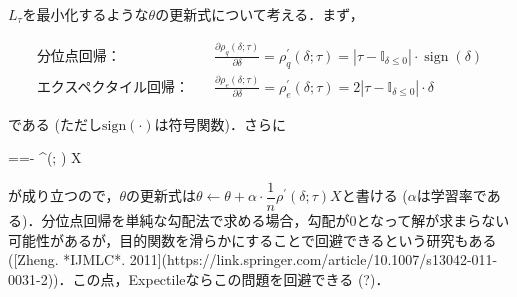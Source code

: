 $L_\tau$を最小化するような$\theta$の更新式について考える．まず，



\begin{align}
\text{分位点回帰：}&\quad
\frac{\partial \rho_q(\delta; \tau)}{\partial \delta}= \rho_q^{\prime}(\delta; \tau)=\left|\tau-\mathbb{I}_{\delta \leq 0}\right| \cdot
\operatorname{sign}(\delta)\\
\text{エクスペクタイル回帰：}&\quad
\frac{\partial \rho_e(\delta; \tau)}{\partial \delta}= \rho_e^{\prime}(\delta; \tau)=2\left|\tau-\mathbb{I}_{\delta \leq 0}\right| \cdot
\delta
\end{align}


である (ただし$\text{sign}(\cdot)$は符号関数)．さらに


=\frac{\partial \delta(\theta)}{\partial \theta}=- \rho^{\prime}(\delta; \tau) X
 

が成り立つので，$\theta$の更新式は$\theta \leftarrow \theta + \alpha\cdot \dfrac{1}{n} \rho^{\prime}(\delta; \tau) X$と書ける ($\alpha$は学習率である)．分位点回帰を単純な勾配法で求める場合，勾配が0となって解が求まらない可能性があるが，目的関数を滑らかにすることで回避できるという研究もある ([Zheng. *IJMLC*. 2011](https://link.springer.com/article/10.1007/s13042-011-0031-2))．この点，Expectileならこの問題を回避できる (?)．
